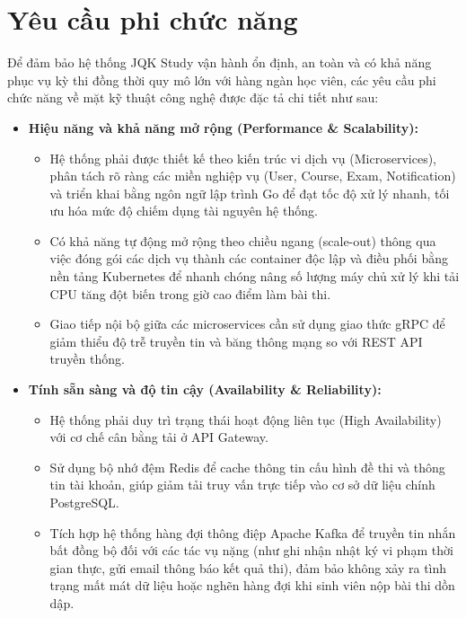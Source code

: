 \documentclass[../DoAn.tex]{subfiles}
\begin{document}
\section{Yêu cầu phi chức năng}
\label{section:2.4}

Để đảm bảo hệ thống JQK Study vận hành ổn định, an toàn và có khả năng phục vụ kỳ thi đồng thời quy mô lớn với hàng ngàn học viên, các yêu cầu phi chức năng về mặt kỹ thuật công nghệ được đặc tả chi tiết như sau:

\begin{itemize}
    \item \textbf{Hiệu năng và khả năng mở rộng (Performance \& Scalability):}
    \begin{itemize}
        \item Hệ thống phải được thiết kế theo kiến trúc vi dịch vụ (Microservices), phân tách rõ ràng các miền nghiệp vụ (User, Course, Exam, Notification) và triển khai bằng ngôn ngữ lập trình Go để đạt tốc độ xử lý nhanh, tối ưu hóa mức độ chiếm dụng tài nguyên hệ thống.
        \item Có khả năng tự động mở rộng theo chiều ngang (scale-out) thông qua việc đóng gói các dịch vụ thành các container độc lập và điều phối bằng nền tảng Kubernetes để nhanh chóng nâng số lượng máy chủ xử lý khi tải CPU tăng đột biến trong giờ cao điểm làm bài thi.
        \item Giao tiếp nội bộ giữa các microservices cần sử dụng giao thức gRPC để giảm thiểu độ trễ truyền tin và băng thông mạng so với REST API truyền thống.
    \end{itemize}

    \item \textbf{Tính sẵn sàng và độ tin cậy (Availability \& Reliability):}
    \begin{itemize}
        \item Hệ thống phải duy trì trạng thái hoạt động liên tục (High Availability) với cơ chế cân bằng tải ở API Gateway.
        \item Sử dụng bộ nhớ đệm Redis để cache thông tin cấu hình đề thi và thông tin tài khoản, giúp giảm tải truy vấn trực tiếp vào cơ sở dữ liệu chính PostgreSQL.
        \item Tích hợp hệ thống hàng đợi thông điệp Apache Kafka để truyền tin nhắn bất đồng bộ đối với các tác vụ nặng (như ghi nhận nhật ký vi phạm thời gian thực, gửi email thông báo kết quả thi), đảm bảo không xảy ra tình trạng mất mát dữ liệu hoặc nghẽn hàng đợi khi sinh viên nộp bài thi dồn dập.
    \end{itemize}


\end{itemize}
\end{document}
